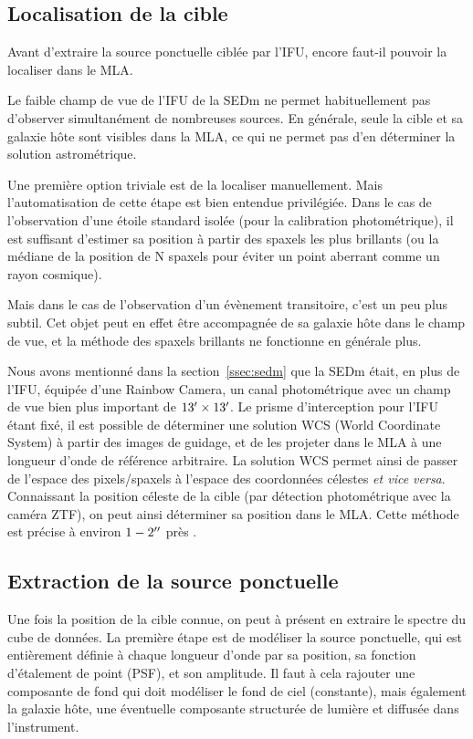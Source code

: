 \documentclass[../main/main.tex]{subfiles}
\begin{document}
\subsection{Localisation de la cible}\label{ssec:targetlocpysedm}

Avant d'extraire la source ponctuelle ciblée par l'IFU, encore faut-il
pouvoir la localiser dans le MLA.

Le faible champ de vue de l'IFU de la SEDm ne permet habituellement pas
d'observer simultanément de nombreuses sources. En générale, seule la
cible et sa galaxie hôte sont visibles dans la MLA, ce qui ne permet pas
d'en déterminer la solution astrométrique.

Une première option triviale est de la
localiser manuellement. Mais l'automatisation de cette étape est bien
entendue privilégiée. Dans le cas de l'observation d'une étoile standard isolée
(pour la calibration photométrique), il est suffisant d'estimer sa
position à partir des spaxels les plus brillants (ou la médiane de la
position de N spaxels pour éviter un point aberrant comme un rayon cosmique).

Mais dans le cas de l'observation d'un évènement transitoire, c'est un peu plus
subtil. Cet objet peut en effet être accompagnée de sa galaxie hôte
dans le champ de vue, et la méthode des spaxels brillants ne fonctionne en
générale plus.

Nous avons mentionné dans la section~\ref{ssec:sedm} que la SEDm était,
en plus de l'IFU, équipée d'une Rainbow Camera, un canal
photométrique avec un champ de vue bien plus important de
$13^\prime\times13^\prime$. Le prisme d'interception pour l'IFU étant
fixé, il est possible de déterminer une solution WCS (World Coordinate
System) à partir des images de guidage, et de les projeter dans le MLA à
une longueur d'onde de référence arbitraire. La solution WCS permet
ainsi de passer de l'espace des pixels/spaxels à l'espace des
coordonnées célestes \textit{et vice versa}. Connaissant la position
céleste de la cible (par détection photométrique avec la
caméra ZTF), on peut ainsi déterminer sa position dans le MLA. Cette
méthode est précise à environ $1-2^{\prime\prime}$ près \citep{pysedm}.

\subsection{Extraction de la source ponctuelle}\label{ssec:sourceextractpysedm}

Une fois la position de la cible connue, on peut à présent en extraire
le spectre du cube de données. La première étape est de modéliser la
source ponctuelle, qui est entièrement définie à chaque longueur d'onde par sa position, sa fonction
d'étalement de point (PSF), et son amplitude. Il faut à cela
rajouter une composante de fond qui doit modéliser le
fond de ciel (constante), mais également la galaxie hôte,
une éventuelle composante structurée de lumière et diffusée dans l'instrument.
\end{document}
